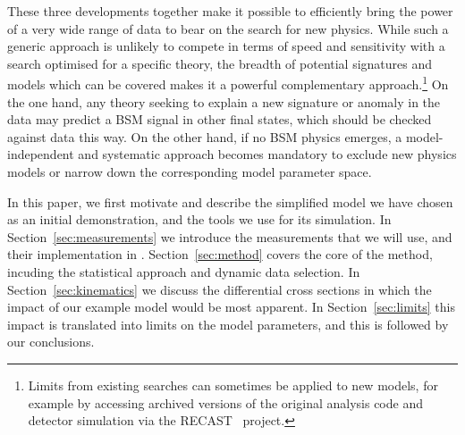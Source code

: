 \documentclass[floatfix]{article}
\begin{document}
These three developments together make it possible to efficiently 
bring the power of a very wide range of data to bear on the search for new physics. While such a generic approach is
unlikely to compete in terms of speed and sensitivity with a search optimised for a specific theory, the breadth
of potential signatures and models which can be covered makes it a powerful complementary approach.\footnote{Limits from existing 
searches can sometimes be applied to new models, for example by accessing archived versions of the original analysis code
and detector simulation via the RECAST~\cite{Cranmer:2010hk} project.}
On the one hand, any theory seeking
to explain a new signature or anomaly in the data may predict a BSM signal in other final states, which should be checked 
against data this way. On the other hand, if no BSM physics emerges, a model-independent and systematic approach becomes mandatory to exclude 
new physics models or narrow down the corresponding model parameter space.

In this paper, we first motivate and describe the 
simplified model we have chosen as an initial demonstration, and the tools we use for its simulation.
In Section~\ref{sec:measurements} we introduce the measurements that we will use, and their implementation in \rivet. 
Section~\ref{sec:method} covers the core of the \Contur method, incuding the statistical approach and dynamic data selection.
In Section~\ref{sec:kinematics} we discuss the differential cross sections in which the impact of our example model would be 
most apparent. In Section~\ref{sec:limits} this impact is translated into limits on the model parameters, and this is followed by our conclusions.
\end{document}

